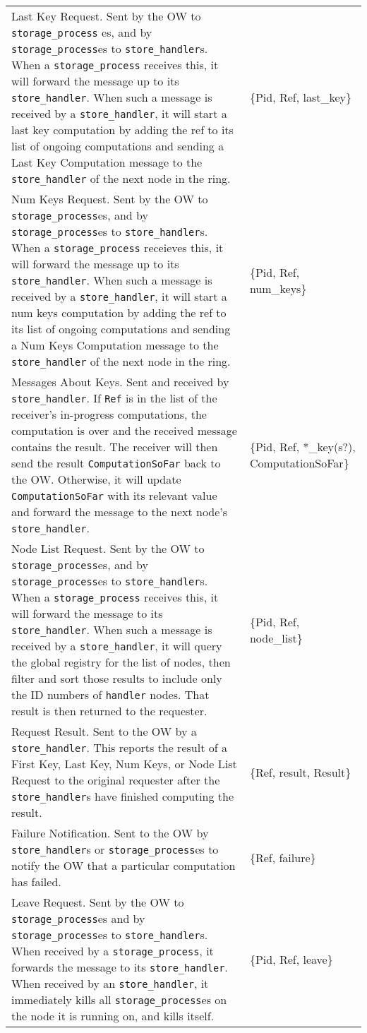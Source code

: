 \documentclass[12pt,letterpaper]{article}
\renewcommand{\tt}[1]{\texttt{#1}}
\newcommand{\sh}{\tt{store\_handler}}
\renewcommand{\sp}{\tt{storage\_process}}
\begin{document}
\begin{longtable}{p{5in}p{1.8in}}
Last Key Request. Sent by the OW to \sp{} es, and by \sp es to \sh s. When a \sp{} receives this, it will forward the message up to its \sh. When such a message is received by a \sh, it will start a last key computation by adding the ref to its list of ongoing computations and sending a Last Key Computation message to the \sh{} of the next node in the ring. &
\{Pid, Ref, last\_key\} \\

Num Keys Request. Sent by the OW to \sp es, and by \sp es to \sh s. When a \sp{} receieves this, it will forward the message up to its \sh. When such a message is received by a \sh, it will start a num keys computation by adding the ref to its list of ongoing computations and sending a Num Keys Computation message to the \sh{} of the next node in the ring. &
\{Pid, Ref, num\_keys\} \\

Messages About Keys.  Sent and received by \sh.  If \tt{Ref} is in the list of the receiver's in-progress computations, the computation is over and the received message contains the result. The receiver will then send the result \tt{ComputationSoFar} back to the OW.  Otherwise, it will update \tt{ComputationSoFar} with its relevant value and forward the message to the next node's \sh.    &
\{Pid, Ref, *\_key(s?), ComputationSoFar\} \vskip.1in {\footnotesize Where that the atom is a regular expression} \\

Node List Request. Sent by the OW to \sp es, and by \sp es to \sh s. When a \sp{} receives this, it will forward the message to its \sh.  When such a message is received by a \sh, it will query the global registry for the list of nodes, then filter and sort those results to include only the ID numbers of \tt{handler} nodes.  That result is then returned to the requester.  &
\{Pid, Ref, node\_list\} \\

Request Result. Sent to the OW by a \sh. This reports the result of a First Key, Last Key, Num Keys, or Node List Request to the original requester after the \sh s have finished computing the result. &
\{Ref, result, Result\} \\

Failure Notification. Sent to the OW by \sh s or \sp es to notify the OW that a particular computation has failed. &
\{Ref, failure\} \\

Leave Request. Sent by the OW to \sp es and by \sp es to \sh s. When received by a \sp, it forwards the message to its \sh. When received by an \sh, it immediately kills all \sp es on the node it is running on, and kills itself. &
\{Pid, Ref, leave\} \\


\end{longtable}
\end{document}
